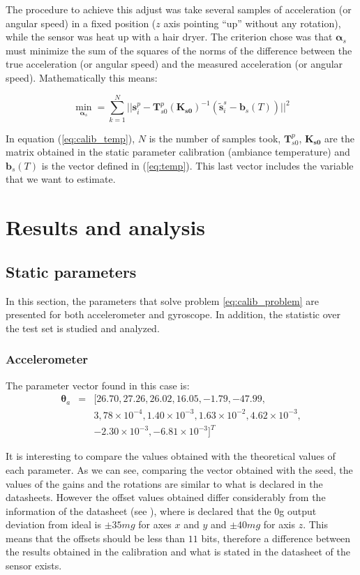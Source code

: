 \documentclass[conference]{IEEEtran}
\newcommand{\refp}[1]{(\ref{#1})}
\begin{document}
The procedure to achieve this adjust was take several samples of acceleration (or angular speed) in a fixed position ($z$ axis pointing ``up'' without any rotation), while the sensor was heat up with a hair dryer. The criterion chose was that $\boldsymbol{\alpha}_s$ must minimize the sum of the squares of the norms of the difference between the true acceleration (or angular speed) and the measured acceleration (or angular speed). Mathematically this means:

\begin{equation}
\min_{\boldsymbol{\alpha}_s} = \sum_{k=1}^N ||\mathbf{s}_i^p - \mathbf{T}_{s0}^p(\mathbf{K_{s0}})^{-1}(\tilde{\mathbf{s}}_i^s-\mathbf{b}_s(T))||^2 
\label{eq:calib_temp}
\end{equation}

In equation \refp{eq:calib_temp}, $N$ is the number of samples took, $\mathbf{T}_{s0}^p$, $\mathbf{K_{s0}}$ are the matrix obtained in the static parameter calibration (ambiance temperature) and $\mathbf{b}_s(T)$ is the vector defined in \refp{eq:temp}. This last vector includes the variable that we want to estimate.\\

\section{Results and analysis}
\subsection{Static parameters}
In this section, the parameters that solve problem \ref{eq:calib_problem} are presented for both accelerometer and gyroscope. In addition, the statistic over the test set is studied and analyzed. \\

\subsubsection{Accelerometer}
The parameter vector found in this case is:
\begin{eqnarray}
\boldsymbol{\theta}_a &=& [26.70, 27.26, 26.02, 16.05, -1.79, -47.99,\\ \nonumber
&& 3,78\times 10^{-4}, 1.40\times 10^{-3}, 1.63 \times 10^{-2},  4.62 \times 10^{-3},\\ \nonumber
&& -2.30\times 10^{-3}, -6.81 \times 10^{-3}]^T \nonumber
\end{eqnarray}

It is interesting to compare the values obtained with the theoretical values of each parameter. As we can see, comparing the vector obtained with the seed, the values of the gains and the rotations are similar to what is declared in the datasheets. However the offset values obtained differ considerably from the information of the datasheet (see \cite{bib:acc_data}), where is declared that the 0g output deviation from ideal is $\pm 35 mg$ for axes $x$ and $y$ and $\pm 40mg$ for axis $z$. This means that the offsets should be less than $11$ bits, therefore a difference between the results obtained in the calibration and what is stated in the datasheet of the sensor exists.\\
\end{document}

